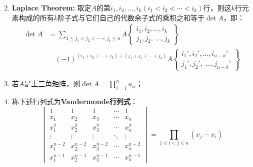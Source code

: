 \begin{property}
\begin{enumerate}
\begin{equation*}
		\end{equation*}
		\item \textbf{Laplace Theorem:} 取定$A$的第$i_1,i_2,\dots,i_k(i_1<i_2<\cdots<i_k)$行，则这$k$行元素构成的所有$k$阶子式与它们自己的代数余子式的乘积之和等于$\det A$，即：
		\begin{align*}
			\det A&=\sum_{1\leqslant j_1<j_2<\cdots<j_k\leqslant n}A\left\{ \begin{array}{l}
				i_1,i_2,\dots,i_k \\
				j_1,j_2,\ \dots,j_k
			\end{array} \right\} \\
			&\quad(-1)^{(i_1+i_2+\cdots+i_k)+(j_1+j_2+\cdots+j_k)}A\left\{ \begin{array}{l}
				i_1',i_2',\dots,i_{n-k}' \\
				j_1',j_2',\ \dots,j_{n-k}'
			\end{array} \right\}
		\end{align*}
		\item 若$A$是上三角矩阵，则$\det A=\prod\limits_{i=1}^na_{ii}$；
		\item 称下述行列式为\textbf{Vandermonde行列式}：
		\begin{equation*}
			\begin{vmatrix}
				1 & 1 & 1 & \cdots & 1 \\
				x_1 & x_2 & x_3 & \cdots & x_n \\
				x_1^2 & x_2^2 & x_3^2 & \cdots & x_n^2 \\
				\vdots & \vdots & \vdots & \ddots & \vdots \\
				x_1^{n-2} & x_2^{n-2} & x_3^{n-2} & \cdots & x_n^{n-2} \\
				x_1^{n-1} & x_2^{n-1} & x_3^{n-1} & \cdots & x_n^{n-1}
			\end{vmatrix}=\prod_{1\leqslant i<j\leqslant n}(x_j-x_i)
		\end{equation*}
	\end{enumerate}
\end{property}
